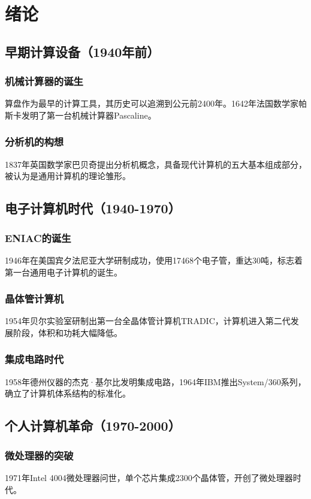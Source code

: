 \chapter{绪论}
\section{早期计算设备（1940年前）}
\subsection{机械计算器的诞生}
算盘作为最早的计算工具，其历史可以追溯到公元前2400年。1642年法国数学家帕斯卡发明了第一台机械计算器Pascaline。

\subsection{分析机的构想}
1837年英国数学家巴贝奇提出分析机概念，具备现代计算机的五大基本组成部分，被认为是通用计算机的理论雏形。

\section{电子计算机时代（1940-1970）}
\subsection{ENIAC的诞生}
1946年在美国宾夕法尼亚大学研制成功，使用17468个电子管，重达30吨，标志着第一台通用电子计算机的诞生。

\subsection{晶体管计算机}
1954年贝尔实验室研制出第一台全晶体管计算机TRADIC，计算机进入第二代发展阶段，体积和功耗大幅降低。

\subsection{集成电路时代}
1958年德州仪器的杰克·基尔比发明集成电路，1964年IBM推出System/360系列，确立了计算机体系结构的标准化。

\section{个人计算机革命（1970-2000）}
\subsection{微处理器的突破}
1971年Intel 4004微处理器问世，单个芯片集成2300个晶体管，开创了微处理器时代。

